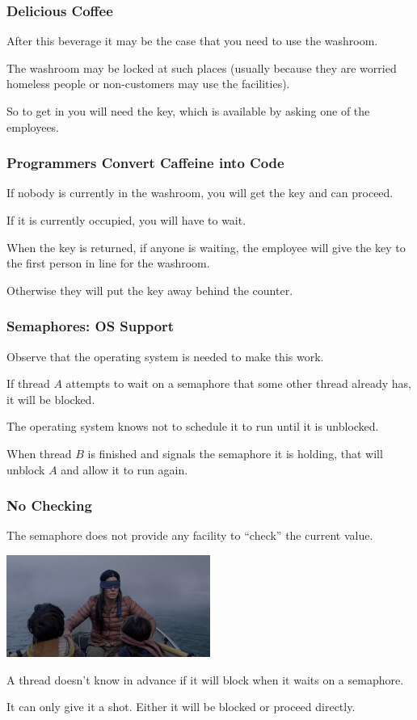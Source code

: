 \begin{frame}
	\frametitle{Delicious Coffee}

	After this beverage it may be the case that you need to use the washroom.

	The washroom may be locked at such places (usually because they are worried homeless people or non-customers may use the facilities).

	So to get in you will need the key, which is available by asking one of the employees.

\end{frame}

\begin{frame}
	\frametitle{Programmers Convert Caffeine into Code}

	If nobody is currently in the washroom, you will get the key and can proceed.

	If it is currently occupied, you will have to wait.

	When the key is returned, if anyone is waiting, the employee will give the key to the first person in line for the washroom.

	Otherwise they will put the key away behind the counter.


\end{frame}

\begin{frame}
	\frametitle{Semaphores: OS Support}

	Observe that the operating system is needed to make this work.

	If thread $A$ attempts to wait on a semaphore that some other thread already has, it will be blocked.

	The operating system knows not to schedule it to run until it is unblocked.

	When thread $B$ is finished and signals the semaphore it is holding, that will unblock $A$ and allow it to run again.


\end{frame}

\begin{frame}
	\frametitle{No Checking}

	The semaphore does not provide any facility to ``check'' the current value.

	\begin{center}
		\includegraphics[width=0.5\textwidth]{images/nopeeking.jpg}
	\end{center}

	A thread doesn't know in advance if it will block when it waits on a semaphore.

	It can only give it a shot. Either it will be blocked or proceed directly.

\end{frame}

